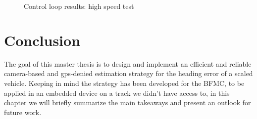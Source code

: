 \documentclass[a4paper,12pt,sort&compress]{article}
\begin{document}
    \begin{figure}
        \centering
        \caption{Control loop results: high speed test}
        \label{fig:control_loop_high}
    \end{figure}


 




\newpage
\section{Conclusion}
The goal of this master thesis is to design and implement an efficient and reliable camera-based and
gps-denied estimation strategy for the heading error of a scaled vehicle. Keeping in mind the
strategy has been developed for the BFMC, to be applied in an embedded device on a track we didn't have access to,  
in this chapter we will briefly summarize the main takeaways and present an outlook for future work.
\end{document}
